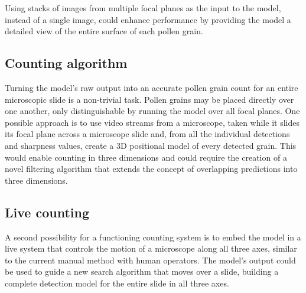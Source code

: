 Using stacks of images from multiple focal planes as the input to the model, instead of a single image, could enhance performance by providing the model a detailed view of the entire surface of each pollen grain.

\subsection*{Counting algorithm}
Turning the model's raw output into an accurate pollen grain count for an entire microscopic slide is a non-trivial task.
Pollen grains may be placed directly over one another, only distinguishable by running the model over all focal planes.
One possible approach is to use video streams from a microscope, taken while it slides its focal plane across a microscope slide and, from all the individual detections and sharpness values, create a 3D positional model of every detected grain.
This would enable counting in three dimensions and could require the creation of a novel filtering algorithm that extends the concept of overlapping predictions into three dimensions.

\subsection*{Live counting}
A second possibility for a functioning counting system is to embed the model in a live system that controls the motion of a microscope along all three axes, similar to the current manual method with human operators.
The model's output could be used to guide a new search algorithm that moves over a slide, building a complete detection model for the entire slide in all three axes.

